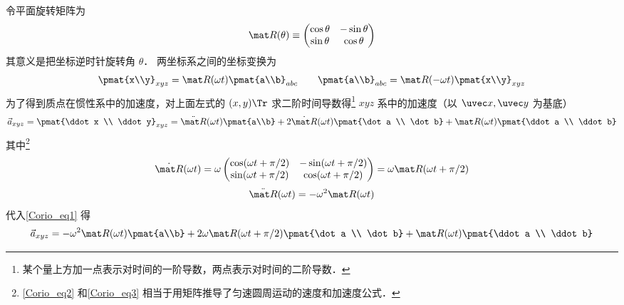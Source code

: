 令平面旋转矩阵为%
\begin{equation}
\mat R(\theta) \equiv \begin{pmatrix}
\cos \theta & - \sin \theta \\
\sin \theta & \cos \theta
\end{pmatrix}
\end{equation}
其意义是把坐标逆时针旋转角 $\theta$． 两坐标系之间的坐标变换为
\begin{equation}
\pmat{x\\y}_{xyz} = \mat R(\omega t) \pmat{a\\b}_{abc}
\qquad
\pmat{a\\b}_{abc} = \mat R(-\omega t) \pmat{x\\y}_{xyz}
\end{equation}
为了得到质点在惯性系中的加速度，对上面左式的 $(x,y)\Tr$ 求二阶时间导数得\footnote{某个量上方加一点表示对时间的一阶导数，两点表示对时间的二阶导数．} $xyz$ 系中的加速度（以 $\uvec x, \uvec y$ 为基底）
\begin{equation}\label{Corio_eq1}
\vec a_{xyz} = \pmat{\ddot x \\ \ddot y}_{xyz} = 
\ddot{\mat R}(\omega t) \pmat{a\\b} + 2\dot{\mat R} (\omega t) \pmat{\dot a \\ \dot b} + \mat R(\omega t)\pmat{\ddot a \\ \ddot b}
\end{equation}
其中\footnote{\autoref{Corio_eq2} 和\autoref{Corio_eq3} 相当于用矩阵推导了匀速圆周运动的速度和加速度公式．}
\begin{equation}\label{Corio_eq2}
\dot{\mat R}(\omega t) = \omega \begin{pmatrix}
\cos(\omega t + \pi /2) &  - \sin(\omega t + \pi /2)\\
\sin(\omega t + \pi /2) & \cos(\omega t + \pi /2)
\end{pmatrix}
= \omega \mat R(\omega t + \pi /2)
\end{equation}
\begin{equation}\label{Corio_eq3}
\ddot{\mat R} (\omega t)  =  - \omega ^2 \mat R (\omega t)
\end{equation}
 代入\autoref{Corio_eq1} 得
\begin{equation}
\vec a_{xyz} =
- \omega ^2 \mat R(\omega t)\pmat{a\\b} + 2\omega \mat R(\omega t + \pi /2)\pmat{\dot a \\ \dot b} + \mat R(\omega t)\pmat{\ddot a \\ \ddot b}
\end{equation}
